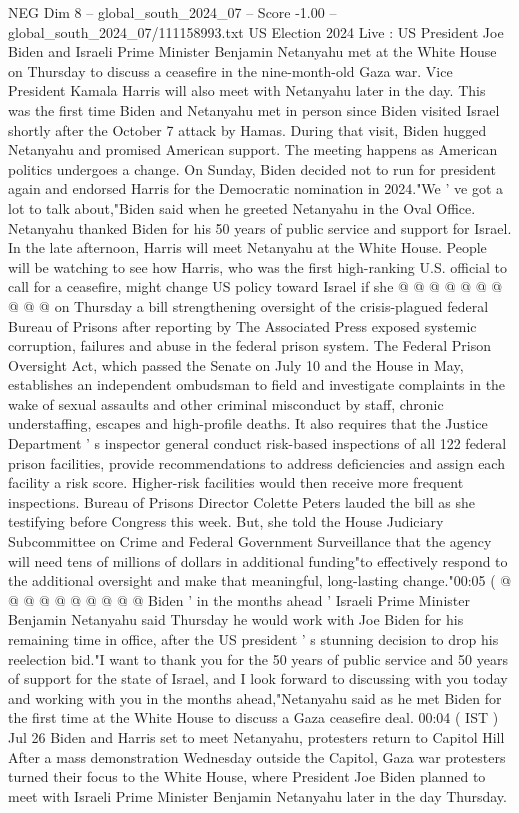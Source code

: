 \begin{textsample}{NEG Dim 8 – global\_south\_2024\_07 – Score -1.00 – global\_south\_2024\_07/111158993.txt}  \label{ex:f8_neg_116}
US Election 2024 Live : US President Joe Biden and Israeli Prime Minister Benjamin Netanyahu met at the White House on Thursday to discuss a ceasefire in the nine-month-old Gaza war.
Vice President Kamala Harris will also meet with Netanyahu later in the day.
This was the first time Biden and Netanyahu met in person since Biden visited Israel shortly after the October 7 attack by Hamas.
During that visit, Biden hugged Netanyahu and promised American support.
The meeting happens as American politics undergoes a change.
On Sunday, Biden decided not to run for president again and endorsed Harris for the Democratic nomination in 2024."We ' ve got a lot to talk about,"Biden said when he greeted Netanyahu in the Oval Office.
Netanyahu thanked Biden for his 50 years of public service and support for Israel.
In the late afternoon, Harris will meet Netanyahu at the White House.
People will be watching to see how Harris, who was the first high-ranking U.S. official to call for a ceasefire, might change US policy toward Israel if she @ @ @ @ @ @ @ @ @ @ on Thursday a bill strengthening oversight of the crisis-plagued federal Bureau of Prisons after reporting by The Associated Press exposed systemic corruption, failures and abuse in the federal prison system.
The Federal Prison Oversight Act, which passed the Senate on July 10 and the House in May, establishes an independent ombudsman to field and investigate complaints in the wake of sexual assaults and other criminal misconduct by staff, chronic understaffing, escapes and high-profile deaths.
It also requires that the Justice Department ' s inspector general conduct risk-based inspections of all 122 federal prison facilities, provide recommendations to address deficiencies and assign each facility a risk score.
Higher-risk facilities would then receive more frequent inspections.
Bureau of Prisons Director Colette Peters lauded the bill as she testifying before Congress this week.
But, she told the House Judiciary Subcommittee on Crime and Federal Government Surveillance that the agency will need tens of millions of dollars in additional funding"to effectively respond to the additional oversight and make that meaningful, long-lasting change."00:05 ( @ @ @ @ @ @ @ @ @ @ Biden ' in the months ahead ' Israeli Prime Minister Benjamin Netanyahu said Thursday he would work with Joe Biden for his remaining time in office, after the US president ' s stunning decision to drop his reelection bid."I want to thank you for the 50 years of public service and 50 years of support for the state of Israel, and I look forward to discussing with you today and working with you in the months ahead,"Netanyahu said as he met Biden for the first time at the White House to discuss a Gaza ceasefire deal. 00:04 ( IST ) Jul 26 Biden and Harris set to meet Netanyahu, protesters return to Capitol Hill After a mass demonstration Wednesday outside the Capitol, Gaza war protesters turned their focus to the White House, where President Joe Biden planned to meet with Israeli Prime Minister Benjamin Netanyahu later in the day Thursday.

\end{textsample}
